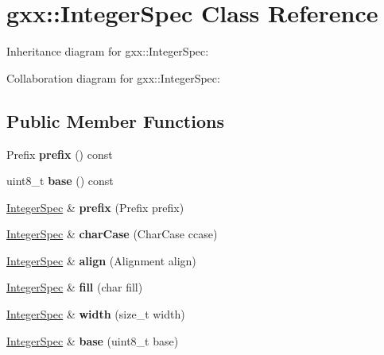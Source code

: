 \hypertarget{classgxx_1_1IntegerSpec}{}\section{gxx\+:\+:Integer\+Spec Class Reference}
\label{classgxx_1_1IntegerSpec}


Inheritance diagram for gxx\+:\+:Integer\+Spec\+:


Collaboration diagram for gxx\+:\+:Integer\+Spec\+:
\subsection*{Public Member Functions}
\begin{DoxyCompactItemize}
\item 
Prefix {\bfseries prefix} () const \hypertarget{classgxx_1_1IntegerSpec_a9bad1b3d99c662a6faf6aa6ce251a049}{}\label{classgxx_1_1IntegerSpec_a9bad1b3d99c662a6faf6aa6ce251a049}

\item 
uint8\+\_\+t {\bfseries base} () const \hypertarget{classgxx_1_1IntegerSpec_af422fd50b97d1ecbf7375b7dd0b75f24}{}\label{classgxx_1_1IntegerSpec_af422fd50b97d1ecbf7375b7dd0b75f24}

\item 
\hyperlink{classgxx_1_1IntegerSpec}{Integer\+Spec} \& {\bfseries prefix} (Prefix prefix)\hypertarget{classgxx_1_1IntegerSpec_afe958f918670fb5b2c2c2879d494aa12}{}\label{classgxx_1_1IntegerSpec_afe958f918670fb5b2c2c2879d494aa12}

\item 
\hyperlink{classgxx_1_1IntegerSpec}{Integer\+Spec} \& {\bfseries char\+Case} (Char\+Case ccase)\hypertarget{classgxx_1_1IntegerSpec_a68cee4b0d7d254abec3b0cf71aabff84}{}\label{classgxx_1_1IntegerSpec_a68cee4b0d7d254abec3b0cf71aabff84}

\item 
\hyperlink{classgxx_1_1IntegerSpec}{Integer\+Spec} \& {\bfseries align} (Alignment align)\hypertarget{classgxx_1_1IntegerSpec_a7381c844f12cc6045efdf5c63e835db8}{}\label{classgxx_1_1IntegerSpec_a7381c844f12cc6045efdf5c63e835db8}

\item 
\hyperlink{classgxx_1_1IntegerSpec}{Integer\+Spec} \& {\bfseries fill} (char fill)\hypertarget{classgxx_1_1IntegerSpec_a78eea382f142a13206e1281dbed7fb45}{}\label{classgxx_1_1IntegerSpec_a78eea382f142a13206e1281dbed7fb45}

\item 
\hyperlink{classgxx_1_1IntegerSpec}{Integer\+Spec} \& {\bfseries width} (size\+\_\+t width)\hypertarget{classgxx_1_1IntegerSpec_a85912c3de715fe0c444c1844d3b4f0d9}{}\label{classgxx_1_1IntegerSpec_a85912c3de715fe0c444c1844d3b4f0d9}

\item 
\hyperlink{classgxx_1_1IntegerSpec}{Integer\+Spec} \& {\bfseries base} (uint8\+\_\+t base)\hypertarget{classgxx_1_1IntegerSpec_a5fd507035c9587d0ac6be6f3d1cbbc48}{}\label{classgxx_1_1IntegerSpec_a5fd507035c9587d0ac6be6f3d1cbbc48}

\end{DoxyCompactItemize}
